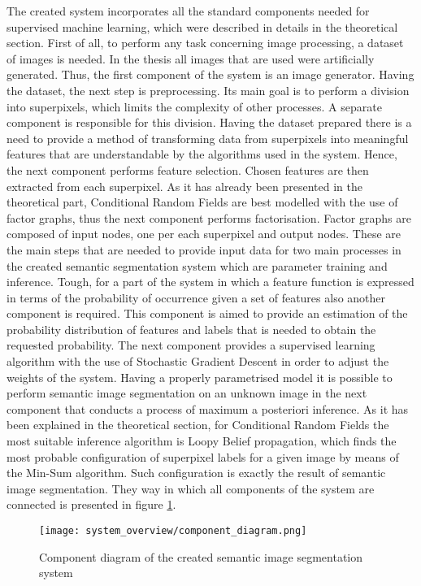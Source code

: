 The created system incorporates all the standard components needed for supervised machine learning, which were described in details in the theoretical section. First of all, to perform any task concerning image processing, a dataset of images is needed. In the thesis all images that are used were artificially generated. Thus, the first component of the system is an image generator. Having the dataset, the next step is preprocessing. Its main goal is to perform a division into superpixels, which limits the complexity of other processes. A separate component is responsible for this division. Having the dataset prepared there is a need to provide a method of transforming data from superpixels into meaningful features that are understandable by the algorithms used in the system. Hence, the next component performs feature selection. Chosen features are then extracted from each superpixel. As it has already been presented in the theoretical part, Conditional Random Fields are best modelled with the use of factor graphs, thus the next component performs factorisation. Factor graphs are composed of input nodes, one per each superpixel and output nodes. These are the main steps that are needed to provide input data for two main processes in the created semantic segmentation system which are parameter training and inference. Tough, for a part of the system in which a feature function is expressed in terms of the probability of occurrence given a set of features also another component is required. This component is aimed to provide an estimation of the probability distribution of features and labels that is needed to obtain the requested probability. The next component provides a supervised learning algorithm with the use of Stochastic Gradient Descent in order to adjust the weights of the system. Having a properly parametrised model it is possible to perform semantic image segmentation on an unknown image in the next component that conducts a process of maximum a posteriori inference. As it has been explained in the theoretical section, for Conditional Random Fields the most suitable inference algorithm is Loopy Belief propagation, which finds the most probable configuration of superpixel labels for a given image by means of the Min-Sum algorithm. Such configuration is exactly the result of semantic image segmentation. They way in which all components of the system are connected is presented in figure \ref{fig:component_diagram}.
\begin{figure}
    \centering
    \texttt{[image: system\_overview/component\_diagram.png]}
    \caption{Component diagram of the created semantic image segmentation system}
    \label{fig:component_diagram}
\end{figure}


